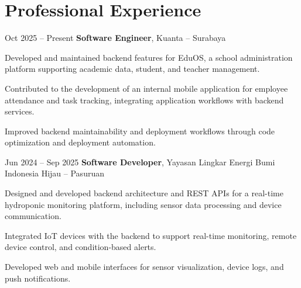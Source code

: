 \section{Professional Experience}
\begin{twocolentrydate}{Oct 2025 -- Present}
	\textbf{Software Engineer}, Kuanta -- Surabaya
\end{twocolentrydate}

\vspace{0.10 cm}


\begin{onecolentry}
	\begin{highlights}
		\item Developed and maintained backend features for EduOS, a school administration platform supporting academic data, student, and teacher management.
		\item Contributed to the development of an internal mobile application for employee attendance and task tracking, integrating application workflows with backend services.
		\item Improved backend maintainability and deployment workflows through code optimization and deployment automation.
	\end{highlights}
\end{onecolentry}

\vspace{0.5 cm}


\begin{twocolentrydate}{Jun 2024 -- Sep 2025}
	\textbf{Software Developer}, Yayasan Lingkar Energi Bumi Indonesia Hijau -- Pasuruan
\end{twocolentrydate}

\vspace{0.10 cm}


\begin{onecolentry}
	\begin{highlights}
		\item Designed and developed backend architecture and REST APIs for a real-time hydroponic monitoring platform, including sensor data processing and device communication.
		\item Integrated IoT devices with the backend to support real-time monitoring, remote device control, and condition-based alerts.
		\item Developed web and mobile interfaces for sensor visualization, device logs, and push notifications.
	\end{highlights}
\end{onecolentry}

